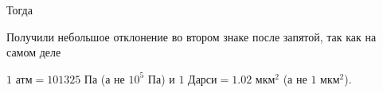Тогда
\beq
\alpha\approx{}
\eeq

Получили небольшое отклонение во втором знаке после запятой, так как на самом деле

$1\text{ атм}=101325\text{ Па}$ (а не $10^5\text{ Па}$) и $1\text{ Дарси}=1.02\text{ мкм}^2$ (а не $1\text{ мкм}^2$).





